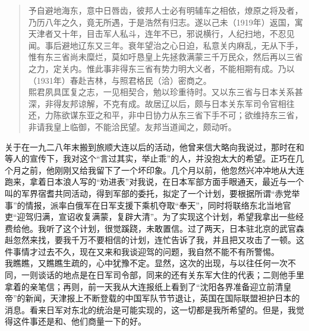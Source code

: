 \begin{quote}
	予自避地海东，意中日唇齿，彼邦人士必有明辅车之相依，燎原之将及者，乃历八年之久，竟无所遇，于是浩然有归志。遂以己未（1919年）返国，寓天津者又十年，目击军人私斗，连年不已，邪说横行，人纪扫地，不忍见闻。事后避地辽东又三年。衰年望治之心日迫，私意关内麻乱，无从下手，惟有东三省尚未糜烂，莫如吁恳皇上先拯救满蒙三千万民众，然后再以三省之力，定关内。惟此事非得东三省有势力明大义者，不能相期有成。乃以（1931年）春赴吉林，与照君格民（洽）密商之。\\

熙君夙具匡复之志，一见相契合，勉以珍重待时。又以东三省与日本关系甚深，非得友邦谅解，不克有成。故居辽以后，颇与日本关东军司令官相往还，力陈欲谋东亚之和平，非中日协力从东三省下手不可；欲维持东三省，非请我皇上临御，不能洽民望。友邦当道闻之，颇动听。\\
\end{quote}

关于在一九二八年末搬到旅顺大连以后的活动，他曾来信大略向我说过，那时在和等人的宣传下，我对这个“言过其实，举止乖”的人，并没抱太大的希望。正巧在几个月之前，他刚刚又给我留下了一个坏印象。几个月以前，他忽然兴冲冲地从大连跑来，拿着日本浪人写的“劝进表”对我说，在日本军部方面手眼通天，最近与一个叫的军界宿耆共同活动，得到军部的委托，拟定了一个计划，要根据所谓“赤党举事”的情报，派率白俄军在日军支援下乘机夺取“奉天”，同时将联络东北当地官吏“迎驾归满，宣诏收复满蒙，复辟大清”。为了实现这个计划，希望我拿出一些经费给他。我听了这个计划，很觉蹊跷，未敢置信。过了两天，日本驻北京的武官森赳忽然来找，要我千万不要相信的计划，连忙告诉了我，并且把又攻击了一顿。这件事情才过去不久，现在又来和我谈迎驾的问题，我自然不能不有所警惕。\\

我瞧瞧，又瞧瞧生疏的，心中犹豫不定。显然，这次的出现，与以往任何一次不同，一则谈话的地点是在日军司令部，同来的还有关东军大住的代表；二则他手里拿着的亲笔信；再则，前一天我从大连报纸上看到了“沈阳各界准备迎立前清皇帝”的新闻，天津报上不断登载的中国军队节节退让，英国在国际联盟袒护日本的消息。看来日军对东北的统治是可能实现的，这一切都是我所希望的。但是，我觉得这件事还是和、他们商量一下的好。\\

